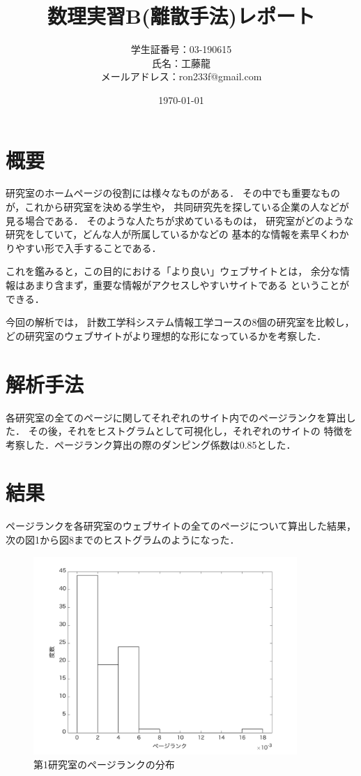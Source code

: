 \documentclass[10pt]{jarticle}
\title{数理実習B(離散手法)レポート}
\author{学生証番号：03-190615\\氏名：工藤龍\\メールアドレス：ron233f@gmail.com}
\date{\today}
\begin{document}
\maketitle

\section{概要}
研究室のホームページの役割には様々なものがある．
その中でも重要なものが，これから研究室を決める学生や，
共同研究先を探している企業の人などが見る場合である．
そのような人たちが求めているものは，
研究室がどのような研究をしていて，どんな人が所属しているかなどの
基本的な情報を素早くわかりやすい形で入手することである．

これを鑑みると，この目的における「より良い」ウェブサイトとは，
余分な情報はあまり含まず，重要な情報がアクセスしやすいサイトである
ということができる．

今回の解析では，
計数工学科システム情報工学コースの8個の研究室を比較し，
どの研究室のウェブサイトがより理想的な形になっているかを考察した．

\section{解析手法}
各研究室の全てのページに関してそれぞれのサイト内でのページランクを算出した．
その後，それをヒストグラムとして可視化し，それぞれのサイトの
特徴を考察した．ページランク算出の際のダンピング係数は0.85とした．

\section{結果}
ページランクを各研究室のウェブサイトの全てのページについて算出した結果，
次の図1から図8までのヒストグラムのようになった．

\begin{figure}[H]
  \begin{center}
  \includegraphics[width=10cm]{../histograms/i1.png}
  \caption{第1研究室のページランクの分布}
  \end{center}
\end{figure}
\end{document}
